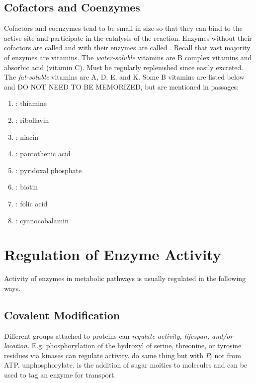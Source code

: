 \documentclass[../Bio_chemistryReview.tex]{subfiles}
\begin{document}
\subsection{Cofactors and Coenzymes\supdag}

Cofactors and coenzymes tend to be small in size so that they can bind to the
active site and participate in the catalysis of the reaction. Enzymes without
their cofactors are called  and with their enzymes are called
. Recall that vast majority of enzymes are vitamins. The
\emph{water-soluble} vitamins are B complex vitamins and absorbic acid (vitamin
C). Must be regularly replenished since easily excreted. The \emph{fat-soluble}
vitamins are A, D, E, and K. Some B vitamins are listed below and DO NOT NEED TO
BE MEMORIZED, but are mentioned in passages:

\begin{enumerate}
  \item {} : thiamine
  \item {} : riboflavin
  \item {} : niacin
  \item {} : pantothenic acid
  \item {} : pyridoxal phosphate
  \item {} : biotin 
  \item {} : folic acid
  \item {} : cyanocobalamin
\end{enumerate}

\section{Regulation of Enzyme Activity}

Activity of enzymes in metabolic pathways is usually regulated in the following
ways.

\subsection{Covalent Modification\supddag}

Different groups attached to proteins can \emph{regulate activity, lifespan,
and/or location.} E.g. phosphorylation of the hydroxyl of serine, threonine, or
tyrosine residues via kinases can regulate activity.  do
same thing but with $ P_{i} $ not from ATP. 
unphosphorylate.  is the addition of sugar moities to
molecules and can be used to tag an enzyme for transport.
\end{document}
